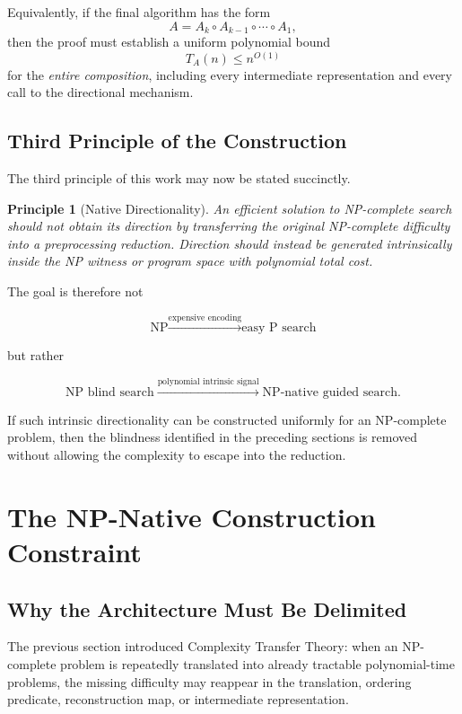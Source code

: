 \documentclass[11pt]{article}
\theoremstyle{plain}
\newtheorem{principle}[theorem]{Principle}
\theoremstyle{definition}
\begin{document}
Equivalently, if the final algorithm has the form
\[
    A=A_k\circ A_{k-1}\circ\cdots\circ A_1,
\]
then the proof must establish a uniform polynomial bound
\[
    T_A(n)\leq n^{O(1)}
\]
for the \emph{entire composition}, including every intermediate
representation and every call to the directional mechanism.

\subsection{Third Principle of the Construction}

The third principle of this work may now be stated succinctly.

\begin{principle}[Native Directionality]
\label{principle:native-directionality}
An efficient solution to NP-complete search should not obtain its direction
by transferring the original NP-complete difficulty into a preprocessing
reduction.  Direction should instead be generated intrinsically inside the
NP witness or program space with polynomial total cost.
\end{principle}

The goal is therefore not

\[
    \boxed{
    \text{NP}
    \xrightarrow{\text{expensive encoding}}
    \text{easy P search}
    }
\]

but rather

\[
    \boxed{
    \text{NP blind search}
    \xrightarrow{\text{polynomial intrinsic signal}}
    \text{NP-native guided search}.
    }
\]

If such intrinsic directionality can be constructed uniformly for an
NP-complete problem, then the blindness identified in the preceding sections
is removed without allowing the complexity to escape into the reduction.


\section{The NP-Native Construction Constraint}
\label{sec:np-native-constraint}

\subsection{Why the Architecture Must Be Delimited}

The previous section introduced Complexity Transfer Theory: when an
NP-complete problem is repeatedly translated into already tractable
polynomial-time problems, the missing difficulty may reappear in the
translation, ordering predicate, reconstruction map, or intermediate
representation.
\end{document}
